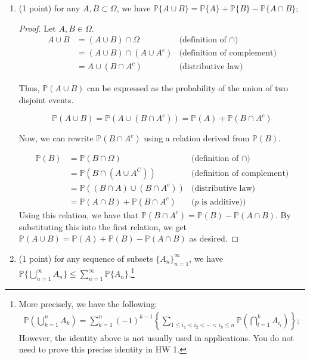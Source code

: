 \documentclass[11pt]{article}
\newcommand{\p}{\mathbb{P}}
\begin{document}
\begin{enumerate}
\item (1 point) for any $A,B\subset\Omega$, we have $\mathbb{P}\{A\cup B\}=\mathbb{P}\{A\}+\mathbb{P}\{B\}-\mathbb{P}\{A\cap B\}$;
\begin{proof}
  Let \(A,B\in\Omega\). 
  \begin{align*}
    A\cup B &= (A\cup B)\cap \Omega & \text{(definition of \(\cap\))}\\
    &= (A\cup B) \cap (A\cup A^c) & \text{(definition of complement)}\\
    &= A\cup (B\cap A^c) & \text{(distributive law)}
  \end{align*}

  Thus, \(\p(A\cup B)\) can be expressed as the probability of the union of two disjoint events.

  \[\p(A\cup B) = \p(A\cup (B\cap A^c)) = \p(A) + \p(B\cap A^c)\]

  Now, we can rewrite \(\p(B\cap A^c)\) using a relation derived from \(\p(B)\).

  \begin{align*}
    \p(B) &= \p(B\cap \Omega) & \text{(definition of \(\cap\))}\\
    &= \p(B\cap (A\cup A^C)) & \text{(definition of complement)}\\
    &= \p((B\cap A)\cup (B\cap A^c)) & \text{(distributive law)}\\
    &= \p(A\cap B) + \p(B\cap A^c) & \text{(\(p\) is additive))}
  \end{align*}
  Using this relation, we have that \(\p(B\cap A^c)=\p(B)-\p(A\cap B)\). By substituting this into 
  the first relation, we get \(\p(A\cup B)=\p(A) + \p(B) - \p(A\cap B)\) as desired.
\end{proof}

\item (1 point) for any sequence of subsets $\{A_n\}_{n=1}^\infty$, we have $\mathbb{P}\{\bigcup_{n=1}^\infty A_n\}\le\sum_{n=1}^\infty\mathbb{P}\{A_n\}$.\footnote{More precisely, we have the following: 
    \begin{align*}
      \mathbb{P}\left(\bigcup_{k=1}^n A_k\right)=\sum_{k=1}^n(-1)^{k-1}\left\{\sum_{1\le i_1<i_2<\cdots<i_k\le n} \mathbb{P}\left(\bigcap_{l=1}^k A_{i_l}\right)\right\};  
    \end{align*}
    However, the identity above is not usually used in applications. You do not need to prove this precise identity in HW 1.}


\end{enumerate}
\end{document}
